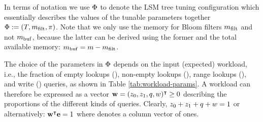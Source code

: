 \begin{table}[h]\centering%
\renewcommand{\arraystretch}{1.1}
\caption{\emph{System} and untunable parameters of an LSM tree.}
	\label{tab:model-system-params}	
\end{table}
    
 In terms of notation we use ${{\Phi}}$ to denote the 
LSM tree tuning configuration which essentially describes the values of the
tunable parameters together  ${{\Phi}} := ({{T}}, {{m_{\mathrm{filt}}}}, {{\pi}})$. Note that we only
use the memory for Bloom filters ${{m_{\mathrm{filt}}}}$ and not 
${{m_{\mathrm{buf}}}}$, because the latter can be derived using the 
former and the 
total available memory: ${{m_{\mathrm{buf}}}}={{m}}-{{m_{\mathrm{filt}}}}$.

  The choice of the parameters in ${{\Phi}}$ 
depends on the input (expected) workload, i.e., the fraction of
empty lookups
    ({\emptylookup}), non-empty lookups ({\nonemptylookup}), range lookups
    ({\range}), and write ({\update}) queries, as shown in Table \ref{tab:workload-params}.
A workload can therefore be expressed as a vector 
    ${{{\bf{w}}} = ({{z_0}}, {{z_1}}, {{q}}, {{w}})^\intercal \geq 0}$
    describing the proportions of the different kinds of queries.
Clearly, ${{z_0}}+{{z_1}}+{{q}}+{{w}} = 1$ or alternatively:
${{\bf{w}}}^\intercal {{\ensuremath{\bf{e}}}} = 1$ where {\columnvec} denotes a column vector of
    ones. %

